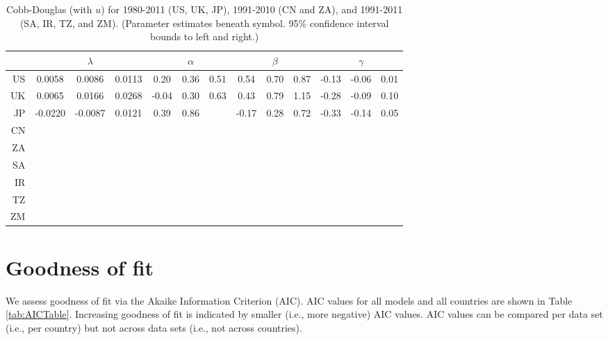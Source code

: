 \documentclass[preprint,authoryear,12pt]{elsarticle}\usepackage{graphicx, color}
\begin{document}
\begin{table}[H]
\begin{center}
\caption{Cobb-Douglas (with $u$) for 1980-2011 (US, UK, JP), 1991-2010 (CN and ZA), and 1991-2011 (SA, IR, TZ, and ZM). (Parameter estimates beneath symbol. 95\% confidence interval bounds to left and right.)}
\label{tab:CD_Parameters_With_U}
{\tiny
\begin{tabular}{r|ccc|ccc|ccc|ccc}
  \hline
 &   & $\lambda$ &   &   & $\alpha$ &   &   & $\beta$ &   &   & $\gamma$ &   \\ 
  \hline
US & 0.0058 & 0.0086 & 0.0113 & 0.20 & 0.36 & 0.51 & 0.54 & 0.70 & 0.87 & -0.13 & -0.06 & 0.01 \\ 
  UK & 0.0065 & 0.0166 & 0.0268 & -0.04 & 0.30 & 0.63 & 0.43 & 0.79 & 1.15 & -0.28 & -0.09 & 0.10 \\ 
  JP & -0.0220 & -0.0087 & 0.0121 & 0.39 & 0.86 &  & -0.17 & 0.28 & 0.72 & -0.33 & -0.14 & 0.05 \\ 
  CN &  &  &  &  &  &  &  &  &  &  &  &  \\ 
  ZA &  &  &  &  &  &  &  &  &  &  &  &  \\ 
  SA &  &  &  &  &  &  &  &  &  &  &  &  \\ 
  IR &  &  &  &  &  &  &  &  &  &  &  &  \\ 
  TZ &  &  &  &  &  &  &  &  &  &  &  &  \\ 
  ZM &  &  &  &  &  &  &  &  &  &  &  &  \\ 
   \hline
\end{tabular}
}
\end{center}
\end{table}



\section{Goodness of fit}
\setcounter{table}{0} %




We assess goodness of fit via the Akaike Information Criterion (AIC). AIC values for all models and all countries are shown in Table \ref{tab:AICTable}. Increasing goodness of fit is indicated by smaller (i.e., more negative) AIC values. AIC values can be compared per data set (i.e., per country) but not across data sets (i.e., not across countries). 
\end{document}
